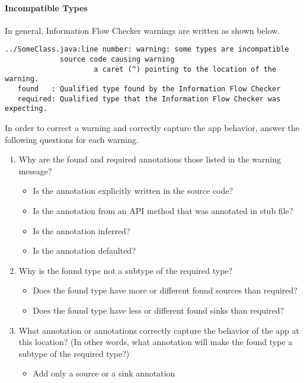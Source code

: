 \paragraph{Incompatible Types}

In general, 
Information Flow Checker warnings are written as shown below.

\begin{Verbatim}  
../SomeClass.java:line number: warning: some types are incompatible 
             source code causing warning
                     a caret (^) pointing to the location of the warning.
   found   : Qualified type found by the Information Flow Checker
   required: Qualified type that the Information Flow Checker was expecting.
\end{Verbatim}
 
In order to correct a warning and correctly capture the app behavior, answer 
the following questions for each warning.
\begin{enumerate}
\item Why are the found and required annotations those listed in the warning message?
   \begin{itemize}
    \item Is the annotation explicitly written in the source code? 
    \item Is the annotation from an API method that was annotated in stub file? 
    \item Is the annotation inferred? 
    \item Is the annotation defaulted? 
    \end{itemize}
\item Why is the found type not a subtype of the required type? 
  \begin{itemize}
   \item Does the found type have more or different found sources than required?
   \item Does the found type have less or different found sinks than required? 
   \end{itemize}
\item What annotation or annotations correctly capture the behavior of the app at
  this location? (In other words, what annotation will make the found type a 
  subtype of the required type?)
   \begin{itemize}
   \item Add only a source or a sink annotation
   \end{itemize}
\end{enumerate}

